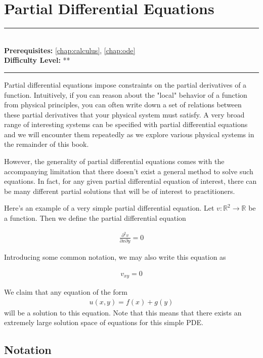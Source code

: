 \documentclass[book.tex]{subfiles}
\begin{document}
\chapter{Partial Differential Equations}
\label{chap:pde}
\noindent\rule{11cm}{0.4pt} \\
\textbf{Prerequisites:} \autoref{chap:calculus}, \autoref{chap:ode} \\
\textbf{Difficulty Level:} ** \\
\noindent\rule{11cm}{0.4pt}
\vspace{5mm}

Partial differential equations impose constraints on the partial derivatives of a function. Intuitively, if you can reason about the "local" behavior of a function from physical principles, you can often write down a set of relations between these partial derivatives that your physical system must satisfy. A very broad range of interesting systems can be specified with partial differential equations and we will encounter them repeatedly as we explore various physical systems in the remainder of this book.

However, the generality of partial differential equations comes with the accompanying limitation that there doesn't exist a general method to solve such equations. In fact, for any given partial differential equation of interest, there can be many different partial solutions that will be of interest to practitioners.

Here's an example of a very simple partial differential equation. Let $v: \mathbb{R}^2 \to \mathbb{R}$ be a function. Then we define the partial differential equation

\begin{align}
    \frac{\partial^2 v}{\partial x \partial y} = 0
\end{align}

Introducing some common notation, we may also write this equation as

\begin{align}
    v_{xy} = 0
\end{align}

We claim that any equation of the form \begin{align}
  u(x, y) = f(x) + g(y)  
\end{align} 
will be a solution to this equation. Note that this means that there exists an extremely large solution space of equations for this simple PDE.

\section{Notation}
\end{document}
